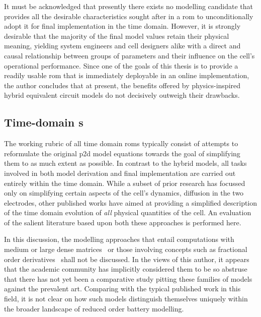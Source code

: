 It must be acknowledged that presently  there exists no modelling candidate that
provides  all the  desirable  characteristics  sought after  in  a \gls{rom}  to
unconditionally adopt it  for final implementation in the  time domain. However,
it is  strongly desirable  that the  majority of the  final model  values retain
their physical meaning, yielding system  engineers and cell designers alike with
a  direct  and  causal  relationship  between groups  of  parameters  and  their
influence on the cell's operational performance.  Since one of the goals of this
thesis is to  provide a readily usable \gls{rom} that  is immediately deployable
in an online implementation, the author  concludes that at present, the benefits
offered by physics-inspired  hybrid equivalent circuit models  do not decisively
outweigh their drawbacks.



\subsection{Time-domain  s}
The working rubric of all time  domain \glspl{rom} typically consist of attempts
to  reformulate the  original  \gls{p2d}  model equations  towards  the goal  of
simplifying  them to  as much  extent  as possible.  In contrast  to the  hybrid
models, all tasks involved in both model derivation and final implementation are
carried out  entirely within the time  domain. While a subset  of prior research
has focussed only  on simplifying certain aspects of the  cell's dynamics, \eg{}
diffusion in the two electrodes, other published works have aimed at providing a
simplified  description of  the  time domain  evolution  of \emph{all}  physical
quantities of the cell. An evaluation  of the salient literature based upon both
these approaches is performed here.


In  this discussion,  the  modelling approaches  that  entail computations  with
medium or large dense matrices~\cite{Li2016,Xu2016,Corno2015} or those involving
concepts such  as fractional  order derivatives~\cite{Sabatier2014,Sabatier2015,
Li2017, Mu2017, Wang2017}  shall not be discussed. In the  views of this author,
it appears that  the academic community has implicitly considered  them to be so
abstruse that there has not yet  been a comparative study pitting these families
of models against  the prevalent art. Comparing with the  typical published work
in  this field,  it  is not  clear  on how  such  models distinguish  themselves
uniquely within the broader landscape of reduced order battery modelling.


